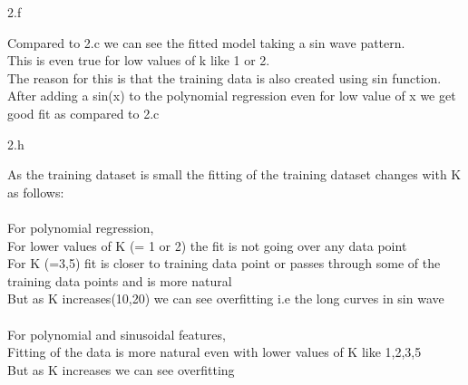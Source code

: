 \LARGE
2.f
\normalsize

\begin{answer}
  \Large
  Compared to 2.c  we can see the fitted model taking a sin wave pattern. \\
  This is even true for low values of k like 1 or 2. \\
  The reason for this is that the training data is also created using sin function. \\
  After adding a sin(x) to the polynomial regression even for low value of x we get good fit as compared to 2.c \\
\end{answer}
\clearpage

\LARGE
2.h
\normalsize

\begin{answer}
  \Large
  As the training dataset is small the fitting of the training dataset changes with K as follows:\\ \\ 
  For polynomial regression, \\
  For lower values of K (= 1 or 2) the fit is not going over any data point\\
  For K (=3,5) fit is closer to training data point or passes through some of the training data points and is more natural \\
  But as K increases(10,20) we can see overfitting i.e the long curves in sin wave\\  \\  
  For polynomial and sinusoidal features, \\ 
  Fitting of the data is more natural even with lower values of K like 1,2,3,5 \\
  But as K increases we can see overfitting
\end{answer}
\clearpage



